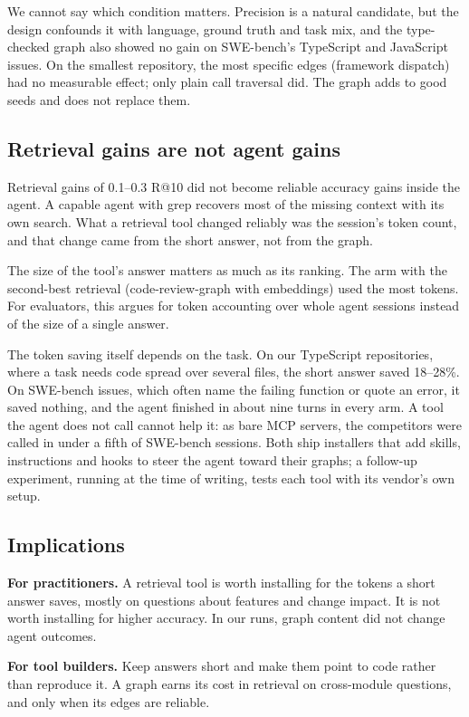 \documentclass[sigconf,nonacm]{acmart}
\makeatletter
\newcommand{\crg}{code-review-graph\xspace}
\newcommand{\rat}{R@10\xspace}
\makeatother
\begin{document}
We cannot say which condition matters. Precision is a natural candidate, but the design confounds it with language, ground truth and task mix, and the type-checked graph also showed no gain on SWE-bench's TypeScript and JavaScript issues. On the smallest repository, the most specific edges (framework dispatch) had no measurable effect; only plain call traversal did. The graph adds to good seeds and does not replace them.

\subsection{Retrieval gains are not agent gains}
Retrieval gains of 0.1--0.3 \rat did not become reliable accuracy gains inside the agent. A capable agent with grep recovers most of the missing context with its own search. What a retrieval tool changed reliably was the session's token count, and that change came from the short answer, not from the graph.

The size of the tool's answer matters as much as its ranking. The arm with the second-best retrieval (\crg with embeddings) used the most tokens. For evaluators, this argues for token accounting over whole agent sessions instead of the size of a single answer.

The token saving itself depends on the task. On our TypeScript repositories, where a task needs code spread over several files, the short answer saved 18--28\%. On SWE-bench issues, which often name the failing function or quote an error, it saved nothing, and the agent finished in about nine turns in every arm. A tool the agent does not call cannot help it: as bare MCP servers, the competitors were called in under a fifth of SWE-bench sessions. Both ship installers that add skills, instructions and hooks to steer the agent toward their graphs; a follow-up experiment, running at the time of writing, tests each tool with its vendor's own setup.

\subsection{Implications}
\textbf{For practitioners.} A retrieval tool is worth installing for the tokens a short answer saves, mostly on questions about features and change impact. It is not worth installing for higher accuracy. In our runs, graph content did not change agent outcomes.

\textbf{For tool builders.} Keep answers short and make them point to code rather than reproduce it. A graph earns its cost in retrieval on cross-module questions, and only when its edges are reliable.
\end{document}
